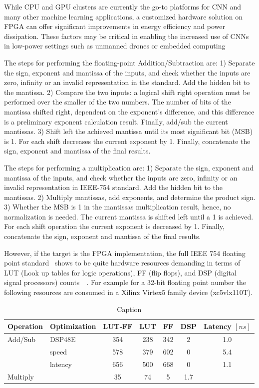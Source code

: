 While CPU and GPU clusters are currently the go-to platforms for CNN and many other machine learning applications, a customized hardware solution on FPGA can offer significant improvements in energy efficiency and power dissipation. These factors may be critical in enabling the increased use of CNNs in low-power settings such as unmanned drones or embedded computing


The steps for performing the floating-point Addition/Subtraction are: 
1) Separate the sign, exponent and mantissa of the inputs, and check whether the inputs are zero, infinity or an invalid representation in the standard. Add the hidden bit to the mantissa.
2) Compare the two inputs: a logical shift right operation must be performed over the smaller of the two numbers. The number of bits of the mantissa shifted right, dependent on the exponent’s difference, and this difference is a preliminary exponent calculation result. Finally, add/sub the current mantissas.
3) Shift left the achieved mantissa until its most significant bit (MSB) is 1. For each shift decreases the current exponent by 1. Finally, concatenate the sign, exponent and mantissa of the final results.

The steps for performing a multiplication are:
1) Separate the sign, exponent and mantissa of the inputs, and check whether the inputs are zero, infinity or an invalid representation in IEEE-754 standard. Add the hidden bit to the mantissas.
2) Multiply mantissas, add exponents, and determine the product sign.
3) Whether the MSB is 1 in the mantissas multiplication result, hence, no normalization is needed. The current mantissa is shifted left until a 1 is achieved. For each shift operation the current exponent is decreased by 1. Finally, concatenate the sign, exponent and mantissa of the final results.


However, if the target is the FPGA implementation, the full IEEE 754 floating point standard~\cite{1985--ieee754} shows to be quite hardware resources demanding in terms of LUT (Look up tables for logic operations), FF (flip flops), and DSP (digital signal processors) counts~\cite{num_lut_for_fp}~\cite{1227254}. 
For example for a 32-bit floating point number the following resources are consumed in a Xilinx Virtex5 family device (xc5vlx110T).
%
\begin{table}[]
    \centering
    \begin{tabular}{l|l|c|c|c|c|c}
        \textbf{Operation} & \textbf{Optimization} & \textbf{LUT-FF} & \textbf{LUT} & \textbf{FF} & \textbf{DSP} & \textbf{Latency} $[ns]$ \\
        \hline
        Add/Sub   & DSP48E  & 354 & 238 & 342 & 2 & 1.0 \\
                  & speed   & 578 & 379 & 602 & 0 & 5.4 \\
                  & latency & 656 & 500 & 668 & 0 & 1.1 \\
                  
        Multiply  &        & 35 & 74  & 5 & 1.7 
    \end{tabular}
    \caption{Caption}
    \label{tab:my_label}
\end{table}

